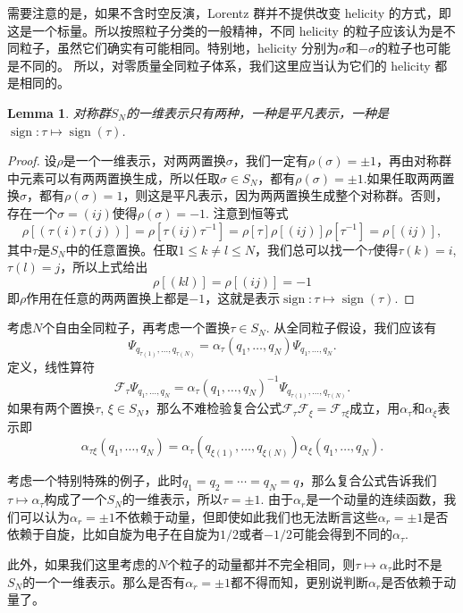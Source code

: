 \documentclass[11pt]{article}
\theoremstyle{definition}
\theoremstyle{plain}
\newtheorem{lem}[para]{Lemma}
\begin{document}
需要注意的是，如果不含时空反演，Lorentz 群并不提供改变 helicity 的方式，即这是一个标量。所以按照粒子分类的一般精神，不同 helicity 的粒子应该认为是不同粒子，虽然它们确实有可能相同。特别地，helicity 分别为$\sigma$和$-\sigma$的粒子也可能是不同的。
所以，对零质量全同粒子体系，我们这里应当认为它们的 helicity 都是相同的。

\begin{lem}
对称群$S_N$的一维表示只有两种，一种是平凡表示，一种是$\operatorname{sign}:\tau\mapsto \operatorname{sign}(\tau)$. 
\end{lem}

\begin{proof}
设$\rho$是一个一维表示，对两两置换$\sigma$，我们一定有$\rho(\sigma)=\pm 1$，再由对称群中元素可以有两两置换生成，所以任取$\sigma\in S_N$，都有$\rho(\sigma)=\pm 1$.如果任取两两置换$\sigma$，都有$\rho(\sigma)=1$，则这是平凡表示，因为两两置换生成整个对称群。否则，存在一个$\sigma=(ij)$使得$\rho(\sigma)=-1$. 注意到恒等式
\[
	\rho[(\tau(i)\tau(j))]=\rho[\tau (ij)\tau^{-1}]=\rho[\tau]\rho[(ij)]\rho[\tau^{-1}]=\rho[(ij)],
\]
其中$\tau$是$S_N$中的任意置换。任取$1\leq k\neq l\leq N$，我们总可以找一个$\tau$使得$\tau(k)=i$, $\tau(l)=j$，所以上式给出
\[
	\rho[(kl)]=\rho[(ij)]=-1
\]
即$\rho$作用在任意的两两置换上都是$-1$，这就是表示$\operatorname{sign}:\tau\mapsto \operatorname{sign}(\tau)$.
\end{proof}

考虑$N$个自由全同粒子，再考虑一个置换$\tau\in S_N$. 从全同粒子假设，我们应该有
\[
	\Psi_{q_{\tau(1)},\dots,q_{\tau(N)}}=\alpha_\tau(q_1,\dots,q_N)\Psi_{q_1,\dots,q_N}.
\]
定义，线性算符
\[
	\mathscr{F}_\tau \Psi_{q_1,\dots,q_N}= \alpha_\tau(q_1,\dots,q_N)^{-1} \Psi_{q_{\tau(1)},\dots,q_{\tau(N)}}.
\]
如果有两个置换$\tau$, $\xi\in S_N$，那么不难检验复合公式$\mathscr{F}_{\tau}\mathscr{F}_{\xi}=\mathscr{F}_{\tau\xi}$成立，用$\alpha_\tau$和$\alpha_\xi$表示即
\[
	\alpha_{\tau\xi}(q_1,\dots,q_N)=\alpha_{\tau}(q_{\xi(1)},\dots,q_{\xi(N)})\alpha_{\xi}(q_1,\dots,q_N).
\]

考虑一个特别特殊的例子，此时$q_1=q_2=\cdots=q_N=q$，那么复合公式告诉我们$\tau \mapsto \alpha_\tau$构成了一个$S_N$的一维表示，所以$\tau=\pm 1$. 由于$\alpha_r$是一个动量的连续函数，我们可以认为$\alpha_r=\pm 1$不依赖于动量，但即使如此我们也无法断言这些$\alpha_r=\pm 1$是否依赖于自旋，比如自旋为电子在自旋为$1/2$或者$-1/2$可能会得到不同的$\alpha_\tau$. 

此外，如果我们这里考虑的$N$个粒子的动量都并不完全相同，则$\tau \mapsto \alpha_\tau$此时不是$S_N$的一个一维表示。那么是否有$\alpha_r=\pm 1$都不得而知，更别说判断$\alpha_r$是否依赖于动量了。
\end{document}
